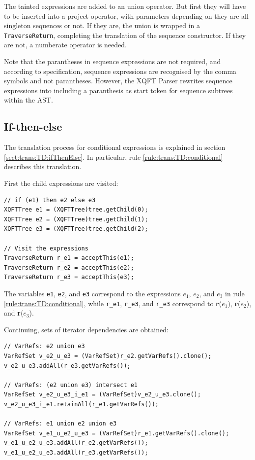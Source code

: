 The tainted expressions are added to an \textsf{union} operator. But first they will have to be inserted into a
\textsf{project} operator, with parameters depending on they are all singleton sequences or not. If they are, the
union is wrapped in a \texttt{TraverseReturn}, completing the translation of the sequence constructor. If they are
not, a \textsf{numberate} operator is needed.

Note that the parantheses in sequence expressions are not required, and
according to specification, sequence expressions are recognised by the comma
symbols and not parantheses. However, the XQFT Parser rewrites sequence
expressions into including a paranthesis as start token for sequence subtrees
within the AST.

\subsection{If-then-else}
The translation process for conditional expressions is explained in section
\ref{sect:trans:TD:ifThenElse}. In particular, rule
\ref{rule:trans:TD:conditional} describes this translation. 

First the child expressions are visited: 

\begin{Verbatim}
// if (e1) then e2 else e3
XQFTTree e1 = (XQFTTree)tree.getChild(0); 
XQFTTree e2 = (XQFTTree)tree.getChild(1);
XQFTTree e3 = (XQFTTree)tree.getChild(2);
        
// Visit the expressions
TraverseReturn r_e1 = acceptThis(e1);
TraverseReturn r_e2 = acceptThis(e2);
TraverseReturn r_e3 = acceptThis(e3);
\end{Verbatim}

The variables \texttt{e1}, \texttt{e2}, and \texttt{e3} correspond to the
expressions $e_1$, $e_2$, and $e_3$ in rule \ref{rule:trans:TD:conditional},
while \texttt{r\_e1}, \texttt{r\_e3}, and \texttt{r\_e3} correspond to
\textbf{r}($e_1$), \textbf{r}($e_2$), and \textbf{r}($e_3$).

Continuing, sets of iterator dependencies are obtained:
         
\begin{Verbatim}
// VarRefs: e2 union e3
VarRefSet v_e2_u_e3 = (VarRefSet)r_e2.getVarRefs().clone();
v_e2_u_e3.addAll(r_e3.getVarRefs());

// VarRefs: (e2 union e3) intersect e1
VarRefSet v_e2_u_e3_i_e1 = (VarRefSet)v_e2_u_e3.clone();
v_e2_u_e3_i_e1.retainAll(r_e1.getVarRefs());

// VarRefs: e1 union e2 union e3
VarRefSet v_e1_u_e2_u_e3 = (VarRefSet)r_e1.getVarRefs().clone();
v_e1_u_e2_u_e3.addAll(r_e2.getVarRefs());
v_e1_u_e2_u_e3.addAll(r_e3.getVarRefs());
\end{Verbatim}

